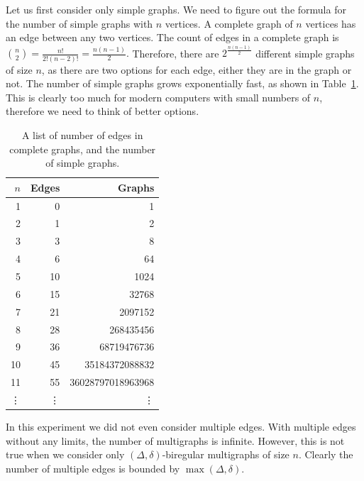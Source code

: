 Let us first consider only simple graphs.
We need to figure out the formula for the number of simple graphs with $n$ vertices.
A complete graph of $n$ vertices has an edge between any two vertices.
The count of edges in a complete graph is \(\binom{n}{2} = \frac{n!}{2!(n-2)!} = \frac{n(n-1)}{2}.\)
Therefore, there are \(2^{\frac{n(n-1)}{2}}\) different simple graphs of size $n$, as there are two options for each edge, either they are in the graph or not.
The number of simple graphs grows exponentially fast, as shown in Table~\ref{tbl:graph_count_growth}.
This is clearly too much for modern computers with small numbers of $n$, therefore we need to think of better options.
\begin{table}[H]
  \centering
  \begin{tabular}{r|rr}
    \toprule
    $n$&Edges&Graphs\\
    \midrule
    1 & 0 &1\\
    2 & 1 &2\\
    3 & 3 &8\\
    4 & 6 &64\\
    5 & 10 &1024\\
    6 & 15 &32768\\
    7 & 21 &2097152\\
    8 & 28 &268435456\\
    9 & 36 &68719476736\\
    10 & 45 &35184372088832\\
    11 & 55 &36028797018963968\\
    \vdots & \vdots &\vdots\\
    \bottomrule
  \end{tabular}
  \caption{
    A list of number of edges in complete graphs, and the number of simple graphs.
  }
  \label{tbl:graph_count_growth}
\end{table}

In this experiment we did not even consider multiple edges.
With multiple edges without any limits, the number of multigraphs is infinite.
However, this is not true when we consider only $(\Delta, \delta)$-biregular multigraphs of size $n$.
Clearly the number of multiple edges is bounded by $\max(\Delta, \delta)$.


